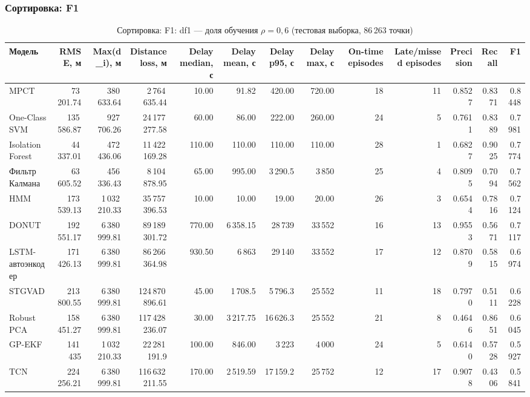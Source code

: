 \documentclass[a4paper,12pt]{report}
\begin{document}
\subsubsection{Сортировка: F1}
\begin{table}[H]
\centering
\scriptsize
\setlength{\tabcolsep}{3pt}
\caption{Сортировка: F1: df1 — доля обучения $\rho=0{,}6$ (тестовая выборка, 86\,263 точки)}
\begin{tabular}{lrrrrrrrrrrrr}
\toprule
Модель & RMSE, м & Max(d\_i), м & Distance loss, м & Delay median, с & Delay mean, с & Delay p95, с & Delay max, с & On-time episodes & Late/missed episodes & Precision & Recall & F1 \\
\midrule
MPCT & 73\,201.74 & 380\,633.64 & 2\,764\,635.44 & 10.00 & 91.82 & 420.00 & 720.00 & 18 & 11 & 0.8527 & 0.8371 & 0.8448 \\
One-Class SVM & 135\,586.87 & 927\,706.26 & 24\,177\,277.58 & 60.00 & 86.00 & 222.00 & 260.00 & 24 & 5 & 0.7611 & 0.8389 & 0.7981 \\
Isolation Forest & 44\,337.01 & 472\,436.06 & 11\,422\,169.28 & 110.00 & 110.00 & 110.00 & 110.00 & 28 & 1 & 0.6827 & 0.9025 & 0.7774 \\
Фильтр Калмана & 63\,605.52 & 456\,336.43 & 8\,104\,878.95 & 65.00 & 995.00 & 3\,290.5 & 3\,850 & 25 & 4 & 0.8095 & 0.7094 & 0.7562 \\
HMM & 173\,539.13 & 1\,032\,210.33 & 35\,757\,396.53 & 10.00 & 10.00 & 19.00 & 20.00 & 26 & 3 & 0.6544 & 0.7816 & 0.7124 \\
DONUT & 192\,551.17 & 6\,380\,999.81 & 89\,189\,301.72 & 770.00 & 6\,358.15 & 28\,739 & 33\,552 & 16 & 13 & 0.9553 & 0.5671 & 0.7117 \\
LSTM-автоэнкодер & 171\,426.13 & 6\,380\,999.81 & 86\,266\,364.98 & 930.50 & 6\,863 & 29\,140 & 33\,552 & 17 & 12 & 0.8709 & 0.5815 & 0.6974 \\
STGVAD & 213\,800.55 & 6\,380\,999.81 & 124\,870\,896.61 & 45.00 & 1\,708.5 & 5\,796.3 & 25\,552 & 11 & 18 & 0.7970 & 0.5111 & 0.6228 \\
Robust PCA & 158\,451.27 & 6\,380\,999.81 & 117\,428\,236.07 & 30.00 & 3\,217.75 & 16\,626.3 & 25\,552 & 21 & 8 & 0.4646 & 0.8651 & 0.6045 \\
GP-EKF & 141\,435 & 1\,032\,210.33 & 22\,281\,191.9 & 100.00 & 846.00 & 3\,223 & 4\,000 & 24 & 5 & 0.6140 & 0.5728 & 0.5927 \\
TCN & 224\,256.21 & 6\,380\,999.81 & 116\,632\,211.55 & 170.00 & 2\,519.59 & 17\,159.2 & 25\,752 & 12 & 17 & 0.9078 & 0.4306 & 0.5841 \\

\end{tabular}
\end{table}
\end{document}
